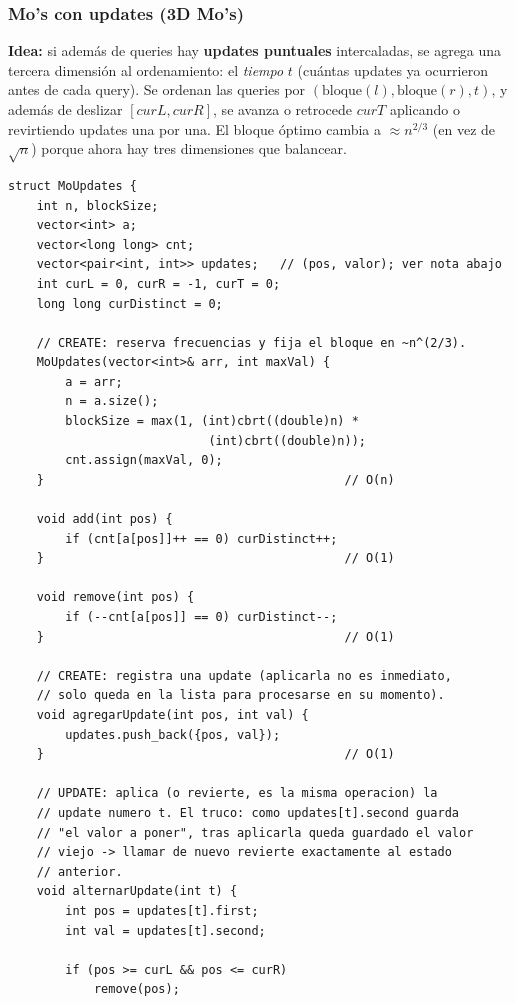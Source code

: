 \documentclass[10pt,a4paper,twocolumn]{article}
\begin{document}
\subsubsection{Mo's con updates (3D Mo's)}

\textbf{Idea:} si además de queries hay \textbf{updates puntuales}
intercaladas, se agrega una tercera dimensión al ordenamiento: el
\emph{tiempo} $t$ (cuántas updates ya ocurrieron antes de cada
query). Se ordenan las queries por
$(\text{bloque}(l), \text{bloque}(r), t)$, y además de deslizar
$[curL,curR]$, se avanza o retrocede $curT$ aplicando o revirtiendo
updates una por una. El bloque óptimo cambia a
$\approx n^{2/3}$ (en vez de $\sqrt n$) porque ahora hay tres
dimensiones que balancear.

\begin{lstlisting}[style=cpp]
struct MoUpdates {
    int n, blockSize;
    vector<int> a;
    vector<long long> cnt;
    vector<pair<int, int>> updates;   // (pos, valor); ver nota abajo
    int curL = 0, curR = -1, curT = 0;
    long long curDistinct = 0;

    // CREATE: reserva frecuencias y fija el bloque en ~n^(2/3).
    MoUpdates(vector<int>& arr, int maxVal) {
        a = arr;
        n = a.size();
        blockSize = max(1, (int)cbrt((double)n) *
                            (int)cbrt((double)n));
        cnt.assign(maxVal, 0);
    }                                          // O(n)

    void add(int pos) {
        if (cnt[a[pos]]++ == 0) curDistinct++;
    }                                          // O(1)

    void remove(int pos) {
        if (--cnt[a[pos]] == 0) curDistinct--;
    }                                          // O(1)

    // CREATE: registra una update (aplicarla no es inmediato,
    // solo queda en la lista para procesarse en su momento).
    void agregarUpdate(int pos, int val) {
        updates.push_back({pos, val});
    }                                          // O(1)

    // UPDATE: aplica (o revierte, es la misma operacion) la
    // update numero t. El truco: como updates[t].second guarda
    // "el valor a poner", tras aplicarla queda guardado el valor
    // viejo -> llamar de nuevo revierte exactamente al estado
    // anterior.
    void alternarUpdate(int t) {
        int pos = updates[t].first;
        int val = updates[t].second;

        if (pos >= curL && pos <= curR)
            remove(pos);


\end{lstlisting}
\end{document}
